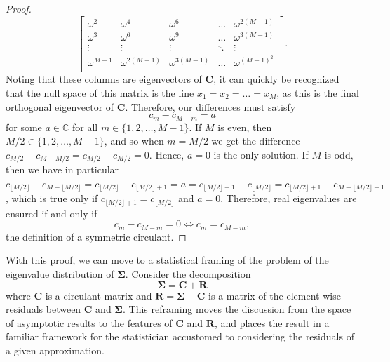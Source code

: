 \documentclass[letterpaper,12pt,oneside,final]{article}
\newcommand{\m}[1]{\mathbf{#1}}               %
\newcommand{\sm}[1]{\boldsymbol{#1}}   %
\newcommand{\field}[1]{\mathbb{#1}}
\newcommand{\Complex}{\field{C}}
\begin{document}
\begin{proof}
$$\begin{bmatrix}
  \omega^2 & \omega^4 & \omega^6 & \dots & \omega^{2(M-1)} \\
  \omega^3 & \omega^6 & \omega^9 & \dots & \omega^{3(M-1)} \\
  \vdots & \vdots & \vdots & \ddots & \vdots \\
  \omega^{M-1} & \omega^{2(M-1)} & \omega^{3(M-1)} & \dots & \omega^{(M-1)^2} \\
  \end{bmatrix}.$$
  Noting that these columns are eigenvectors of $\m{C}$, it can quickly be recognized that the null space of this matrix is the line $x_1 = x_2 = \dots = x_M$, as this is the final orthogonal eigenvector of $\m{C}$. Therefore, our differences must satisfy
  $$c_m - c_{M-m} = a$$
  for some $a \in \Complex$ for all $m \in \{1, 2, \dots, M-1\}$. If $M$ is even, then $M/2 \in \{1, 2, \dots, M-1\}$, and so when $m = M/2$ we get the difference $c_{M/2} - c_{M - M/2} = c_{M/2} - c_{M/2} = 0$. Hence, $a = 0$ is the only solution. If $M$ is odd, then we have in particular $c_{\lfloor M/2 \rfloor} - c_{M - \lfloor M/2 \rfloor} = c_{\lfloor M/2 \rfloor} - c_{\lfloor M/2 \rfloor + 1} = a = c_{\lfloor M/2 \rfloor + 1} - c_{\lfloor M/2 \rfloor} = c_{\lfloor M/2 \rfloor + 1} - c_{M - \lfloor M/2 \rfloor - 1}$, which is true only if $c_{\lfloor M/2 \rfloor + 1} = c_{\lfloor M/2 \rfloor}$ and $a = 0$. Therefore, real eigenvalues are ensured if and only if
  $$c_m - c_{M-m} = 0 \iff c_m = c_{M-m},$$
  the definition of a symmetric circulant.
\end{proof}

With this proof, we can move to a statistical framing of the problem of the eigenvalue distribution of $\sm{\Sigma}$. Consider the decomposition
\begin{equation} \label{eq:circDecomp}
  \sm{\Sigma} = \m{C} + \m{R}
\end{equation}
where $\m{C}$ is a circulant matrix and $\m{R} = \sm{\Sigma} - \m{C}$ is a matrix of the element-wise residuals between $\m{C}$ and $\sm{\Sigma}$. This reframing moves the discussion from the space of asymptotic results to the features of $\m{C}$ and $\m{R}$, and places the result in a familiar framework for the statistician accustomed to considering the residuals of a given approximation.
\end{document}
